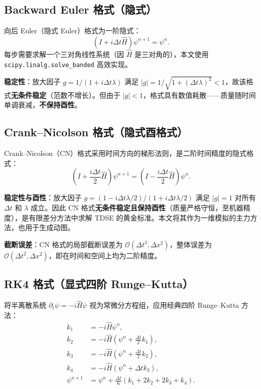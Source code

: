 \documentclass[12pt,a4paper]{article}
\begin{document}
\subsection{Backward Euler 格式（隐式）}

向后 Euler（隐式 Euler）格式为一阶隐式：
\begin{equation}
    (I + i\Delta t \hat{H}) \psi^{n+1} = \psi^n.
\end{equation}
每步需要求解一个三对角线性系统（因 $\hat{H}$ 是三对角的），本文使用 \texttt{scipy.linalg.solve\_banded} 高效实现。

\textbf{稳定性}：放大因子 $g = 1/(1 + i\Delta t\lambda)$ 满足 $|g| = 1/\sqrt{1+(\Delta t\lambda)^2} < 1$，故该格式\textbf{无条件稳定}（范数不增长）。但由于 $|g| < 1$，格式具有数值耗散——质量随时间单调衰减，\textbf{不保持酉性}。

\subsection{Crank--Nicolson 格式（隐式酉格式）}

Crank--Nicolson（CN）格式采用时间方向的梯形法则，是二阶时间精度的隐式格式：
\begin{equation}\label{eq:cn}
    \left(I + \frac{i\Delta t}{2}\hat{H}\right) \psi^{n+1}
    = \left(I - \frac{i\Delta t}{2}\hat{H}\right) \psi^n.
\end{equation}

\textbf{稳定性与酉性}：放大因子 $g = (1 - i\Delta t\lambda/2)/(1 + i\Delta t\lambda/2)$ 满足 $|g| = 1$ 对所有 $\Delta t$ 和 $\lambda$ 成立。因此 CN 格式\textbf{无条件稳定且保持酉性}（质量严格守恒，至机器精度），是有限差分方法中求解 TDSE 的黄金标准。本文将其作为一维模拟的主力方法，也用于生成动图。

\textbf{截断误差}：CN 格式的局部截断误差为 $\mathcal{O}(\Delta t^3, \Delta x^2)$，整体误差为 $\mathcal{O}(\Delta t^2, \Delta x^2)$，即在时间和空间上均为二阶精度。

\subsection{RK4 格式（显式四阶 Runge--Kutta）}

将半离散系统 $\partial_t \psi = -i\hat{H}\psi$ 视为常微分方程组，应用经典四阶 Runge--Kutta 方法：
\begin{align}
    k_1 &= -i\hat{H}\psi^n, \nonumber\\
    k_2 &= -i\hat{H}(\psi^n + \tfrac{\Delta t}{2}k_1), \nonumber\\
    k_3 &= -i\hat{H}(\psi^n + \tfrac{\Delta t}{2}k_2), \nonumber\\
    k_4 &= -i\hat{H}(\psi^n + \Delta t k_3), \nonumber\\
    \psi^{n+1} &= \psi^n + \frac{\Delta t}{6}(k_1 + 2k_2 + 2k_3 + k_4). \label{eq:rk4}
\end{align}
\end{document}
